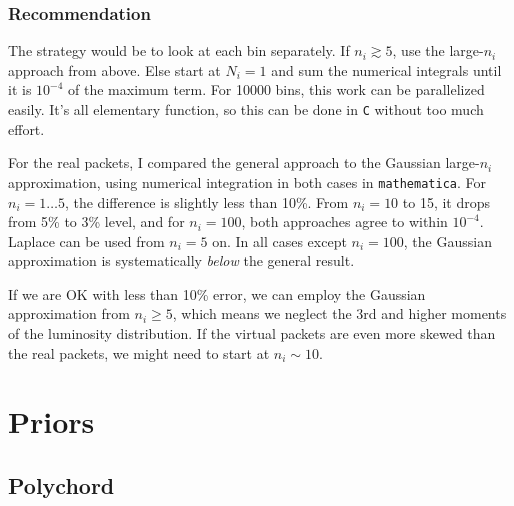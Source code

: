 \documentclass[a4,12pt]{article}
\begin{document}
\subsubsection*{Recommendation}

The strategy would be to look at each bin separately. If $n_i \gtrsim
5$, use the large-$n_i$ approach from above. Else start at $N_i=1$ and
sum the numerical integrals until it is $10^{-4}$ of the maximum
term. For 10000 bins, this work can be parallelized easily. It's all
elementary function, so this can be done in \texttt{C} without too
much effort.

For the real packets, I compared the general approach to the Gaussian
large-$n_i$ approximation, using numerical integration in both cases
in \texttt{mathematica}. For $n_i=1\dots5$, the difference is slightly
less than 10\%. From $n_i=10$ to 15, it drops from 5\% to 3\% level,
and for $n_i=100$, both approaches agree to within $10^{-4}$. Laplace
can be used from $n_i=5$ on. In all cases except $n_i=100$, the
Gaussian approximation is systematically \emph{below} the general
result.

If we are OK with less than 10\% error, we can employ the Gaussian
approximation from $n_i\ge5$, which means we neglect the 3rd and
higher moments of the luminosity distribution. If the virtual packets
are even more skewed than the real packets, we might need to start at
$n_i \sim 10$.

\section{Priors}

\subsection{Polychord}
\end{document}
